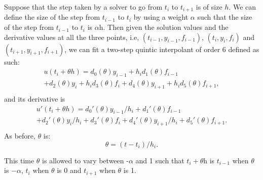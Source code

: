 Suppose that the step taken by a solver to go from $t_i$ to $t_{i + 1}$ is of size $h$. We can define the size of the step from $t_{i - 1}$ to $t_i$ by using a weight $\alpha$ such that the size of the step from $t_{i - 1}$ to $t_i$ is $\alpha$h. Then given the solution values and the derivative values at all the three points, i.e, $(t_{i-1}, y_{i - 1}, f_{i - 1})$, $(t_i, y_i, f_i)$ and $(t_{i + 1}, y_{i + 1}, f_{i + 1})$, we can fit a two-step quintic interpolant of order 6 defined as such:
\begin{equation}
\begin{split}
u(t_i + \theta h) = d_{0}(\theta) y_{i-1} +  h_id_{1}(\theta)f_{i-1} \\
+ d_{2}(\theta)y_i     +  h_id_{3}(\theta)f_i
+ d_{4}(\theta)y_{i + 1} + h_id_{5}(\theta)f_{i + 1}, \\
\end{split}
\end{equation}
and its derivative is
\begin{equation}
\begin{split}
u'(t_i + \theta h) = d_{0}'(\theta)y_{i-1}/h_i +  d_{1}'(\theta)f_{i-1} \\
+ d_{2}'(\theta)y_i/h_i     +  d_{3}'(\theta)f_i
+ d_{4}'(\theta)y_{i + 1}/h_i + d_{5}'(\theta)f_{i + 1}. \\
\end{split}
\end{equation}
As before, $\theta$ is:
\begin{equation}
\theta = (t - t_i) / h_i.
\end{equation}

This time $\theta$ is allowed to vary between -$\alpha$ and 1 such that $t_i + \theta$h is $t_{i - 1}$ when $\theta$ is $-\alpha$, $t_i$ when $\theta$ is 0 and $t_{i + 1}$ when $\theta$ is 1.

